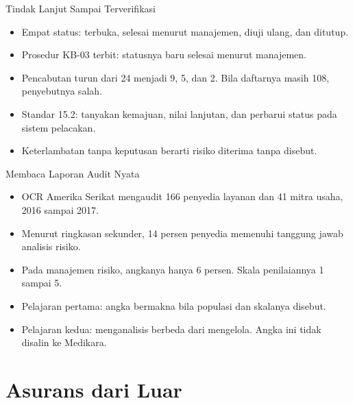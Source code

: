 \documentclass[aspectratio=169, table, 12pt]{beamer}
\begin{document}
\begin{frame}{{\Large Tindak Lanjut Sampai Terverifikasi}}
  \vspace{6pt}
  \small
  \begin{itemize}
    \item Empat status: terbuka, selesai menurut manajemen, diuji ulang, dan ditutup.
    \item Prosedur KB-03 terbit: statusnya baru selesai menurut manajemen.
    \item Pencabutan turun dari 24 menjadi 9, 5, dan 2. Bila daftarnya masih 108, penyebutnya salah.
    \item Standar 15.2: tanyakan kemajuan, nilai lanjutan, dan perbarui status pada sistem
          pelacakan.
    \item Keterlambatan tanpa keputusan berarti risiko diterima tanpa disebut.
  \end{itemize}
\end{frame}

\begin{frame}{{\Large Membaca Laporan Audit Nyata}}
  \vspace{6pt}
  \small
  \begin{itemize}
    \item OCR Amerika Serikat mengaudit 166 penyedia layanan dan 41 mitra usaha, 2016 sampai 2017.
    \item Menurut ringkasan sekunder, 14 persen penyedia memenuhi tanggung jawab analisis risiko.
    \item Pada manajemen risiko, angkanya hanya 6 persen. Skala penilaiannya 1 sampai 5.
    \item Pelajaran pertama: angka bermakna bila populasi dan skalanya disebut.
    \item Pelajaran kedua: menganalisis berbeda dari mengelola. Angka ini tidak disalin ke Medikara.
  \end{itemize}
\end{frame}

\section{Asurans dari Luar}
\end{document}
